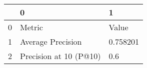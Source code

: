 \begin{tabular}{lll}
\toprule
{} &                       0 &         1 \\
\midrule
0 &                  Metric &     Value \\
1 &       Average Precision &  0.758201 \\
2 &  Precision at 10 (P@10) &       0.6 \\
\bottomrule
\end{tabular}
